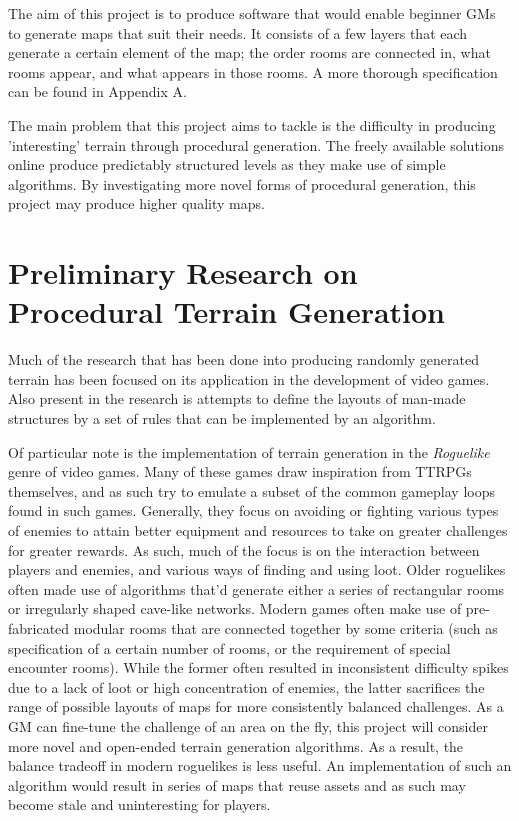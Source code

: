 \documentclass{article}
\begin{document}
The aim of this project is to produce software that would enable beginner GMs to generate maps that suit their needs. It consists of a few layers that each generate a certain element of the map; the order rooms are connected in, what rooms appear, and what appears in those rooms. A more thorough specification can be found in Appendix A.



The main problem that this project aims to tackle is the difficulty in producing 'interesting' terrain through procedural generation. The freely available solutions online produce predictably structured levels as they make use of simple algorithms. By investigating more novel forms of procedural generation, this project may produce higher quality maps. 


\section{Preliminary Research on Procedural Terrain Generation}
Much of the research that has been done into producing randomly generated terrain has been focused on its application in the development of video games. Also present in the research is attempts to define the layouts of man-made structures by a set of rules that can be implemented by an algorithm. 



Of particular note is the implementation of terrain generation in the \textit{Roguelike} genre of video games. Many of these games draw inspiration from TTRPGs themselves, and as such try to emulate a subset of the common gameplay loops found in such games. Generally, they focus on avoiding or fighting various types of enemies to attain better equipment and resources to take on greater challenges for greater rewards. As such, much of the focus is on the interaction between players and enemies, and various ways of finding and using loot. Older roguelikes often made use of algorithms that'd generate either a series of rectangular rooms or irregularly shaped cave-like networks. Modern games often make use of pre-fabricated modular rooms that are connected together by some criteria (such as specification of a certain number of rooms, or the requirement of special encounter rooms). \linebreak
While the former often resulted in inconsistent difficulty spikes due to a lack of loot or high concentration of enemies, the latter sacrifices the range of possible layouts of maps for more consistently balanced challenges. As a GM can fine-tune the challenge of an area on the fly, this project will consider more novel and open-ended terrain generation algorithms. As a result, the balance tradeoff in modern roguelikes is less useful. An implementation of such an algorithm would result in series of maps that reuse assets and as such may become stale and uninteresting for players.
\end{document}
